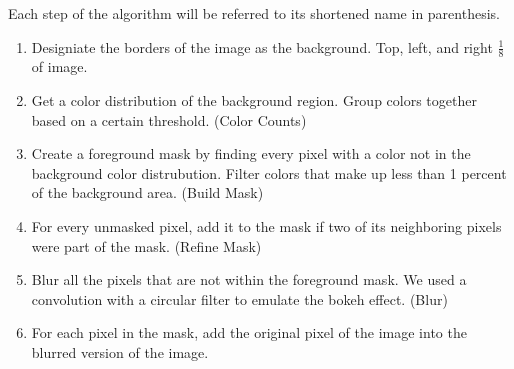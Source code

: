 \documentclass[12pt]{article}
\begin{document}
Each step of the algorithm will be referred to its shortened name in
parenthesis.
\begin{enumerate}
    \item
        Designiate the borders of the image as the background. Top, left, and
        right $\tfrac{1}{8}$ of image.
    \item
        Get a color distribution of the background region. Group colors together
        based on a certain threshold. (Color Counts)
    \item
        Create a foreground mask by finding every pixel with a color not
        in the background color distrubution. Filter colors that make up
        less than 1 percent of the background area. (Build Mask)
    \item
        For every unmasked pixel, add it to the mask if two of its neighboring
        pixels were part of the mask. (Refine Mask)
    \item
        Blur all the pixels that are not within the foreground mask. We used a
        convolution with a circular filter to emulate the bokeh effect. (Blur)
    \item
        For each pixel in the mask, add the original pixel of the image into
        the blurred version of the image.
\end{enumerate}
\end{document}
